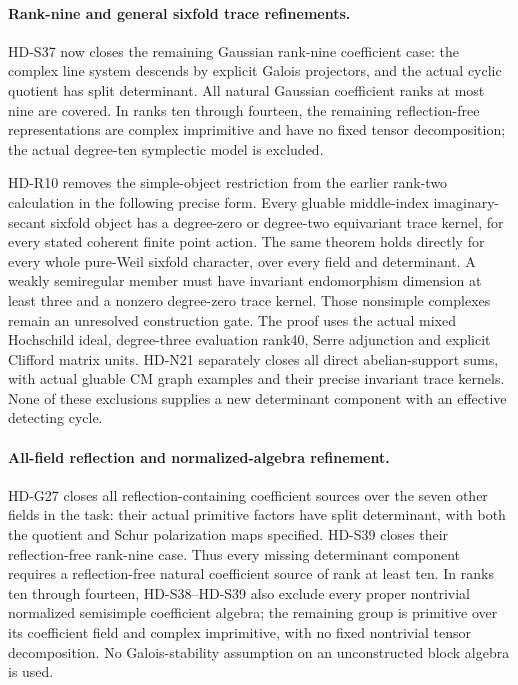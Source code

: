 \paragraph{Rank-nine and general sixfold trace refinements.}
HD-S37 now closes the remaining Gaussian rank-nine coefficient
case: the complex line system descends by explicit Galois
projectors, and the actual cyclic quotient has split determinant.
All natural Gaussian coefficient ranks at most nine are covered.
In ranks ten through fourteen, the remaining reflection-free
representations are complex imprimitive and have no fixed tensor
decomposition; the actual degree-ten symplectic model is excluded.

HD-R10 removes the simple-object restriction from the earlier
rank-two calculation in the following precise form. Every gluable
middle-index imaginary-secant sixfold object has a degree-zero or
degree-two equivariant trace kernel, for every stated coherent
finite point action. The same theorem holds directly for every
whole pure-Weil sixfold character, over every field and determinant.
A weakly semiregular member must have invariant endomorphism
dimension at least three and a nonzero degree-zero trace kernel.
Those nonsimple complexes remain an unresolved construction gate.
The proof uses the actual mixed Hochschild ideal, degree-three
evaluation rank40, Serre adjunction and explicit Clifford matrix
units. HD-N21 separately closes all direct abelian-support sums,
with actual gluable CM graph examples and their precise invariant
trace kernels. None of these exclusions supplies a new determinant
component with an effective detecting cycle.

\paragraph{All-field reflection and normalized-algebra refinement.}
HD-G27 closes all reflection-containing coefficient sources over
the seven other fields in the task: their actual primitive factors
have split determinant, with both the quotient and Schur
polarization maps specified. HD-S39 closes their reflection-free
rank-nine case. Thus every missing determinant component requires
a reflection-free natural coefficient source of rank at least ten.
In ranks ten through fourteen, HD-S38--HD-S39 also exclude every
proper nontrivial normalized semisimple coefficient algebra;
the remaining group is primitive over its coefficient field and
complex imprimitive, with no fixed nontrivial tensor decomposition.
No Galois-stability assumption on an unconstructed block algebra
is used.

